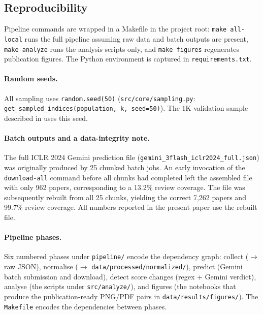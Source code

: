 \documentclass{article}
\newcommand{\code}[1]{\texttt{#1}}
\begin{document}
\subsection{Reproducibility}\label{app:repro}

Pipeline commands are wrapped in a Makefile in the project root: \code{make all-local} runs the full pipeline assuming raw data and batch outputs are present, \code{make analyze} runs the analysis scripts only, and \code{make figures} regenerates publication figures. The Python environment is captured in \code{requirements.txt}.

\paragraph{Random seeds.}
All sampling uses \code{random.seed(50)} (\code{src/core/sampling.py}: \code{get\_sampled\_indices(population, k, seed=50)}). The 1K validation sample described in  uses this seed.

\paragraph{Batch outputs and a data-integrity note.}
The full ICLR 2024 Gemini prediction file (\code{gemini\_3flash\_iclr2024\_full.json}) was originally produced by 25 chunked batch jobs. An early invocation of the \code{download-all} command before all chunks had completed left the assembled file with only 962 papers, corresponding to a 13.2\% review coverage. The file was subsequently rebuilt from all 25 chunks, yielding the correct 7,262 papers and 99.7\% review coverage. All numbers reported in the present paper use the rebuilt file.

\paragraph{Pipeline phases.}
Six numbered phases under \code{pipeline/} encode the dependency graph: collect ($\to$ raw JSON), normalise ($\to$ \code{data/processed/normalized/}), predict (Gemini batch submission and download), detect score changes (regex + Gemini verdict), analyse (the scripts under \code{src/analyze/}), and figures (the notebooks that produce the publication-ready PNG/PDF pairs in \code{data/results/figures/}). The \code{Makefile} encodes the dependencies between phases.
\end{document}
